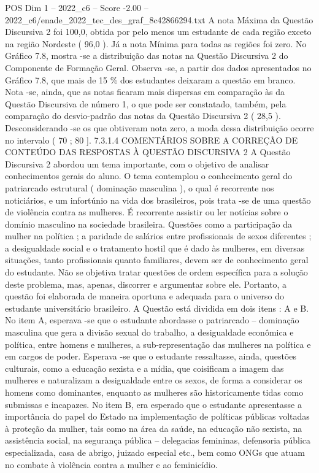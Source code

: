 \begin{textsample}{POS Dim 1 – 2022\_c6 – Score -2.00 – 2022\_c6/enade\_2022\_tec\_des\_graf\_8c42866294.txt}
A nota Máxima da Questão Discursiva 2 foi 100,0, obtida por pelo menos um estudante de cada região exceto na região Nordeste ( 96,0 ).
Já a nota Mínima para todas as regiões foi zero.
No Gráfico 7.8, mostra -se a distribuição das notas na Questão Discursiva 2 do Componente de Formação Geral.
Observa -se, a partir dos dados apresentados no Gráfico 7.8, que mais de 15 \% dos estudantes deixaram a questão em branco.
Nota -se, ainda, que as notas ficaram mais dispersas em comparação às da Questão Discursiva de número 1, o que pode ser constatado, também, pela comparação do desvio-padrão das notas da Questão Discursiva 2 ( 28,5 ).
Desconsiderando -se os que obtiveram nota zero, a moda dessa distribuição ocorre no intervalo ( 70 ; 80 ]. 7.3.1.4 COMENTÁRIOS SOBRE A CORREÇÃO DE CONTEÚDO DAS RESPOSTAS À QUESTÃO DISCURSIVA 2 A Questão Discursiva 2 abordou um tema importante, com o objetivo de analisar conhecimentos gerais do aluno.
O tema contemplou o conhecimento geral do patriarcado estrutural ( dominação masculina ), o qual é recorrente nos noticiários, e um infortúnio na vida dos brasileiros, pois trata -se de uma questão de violência contra as mulheres.
É recorrente assistir ou ler notícias sobre o domínio masculino na sociedade brasileira.
Questões como a participação da mulher na política ; a paridade de salários entre profissionais de sexos diferentes ; a desigualdade social e o tratamento hostil que é dado às mulheres, em diversas situações, tanto profissionais quanto familiares, devem ser de conhecimento geral do estudante.
Não se objetiva tratar questões de ordem específica para a solução deste problema, mas, apenas, discorrer e argumentar sobre ele.
Portanto, a questão foi elaborada de maneira oportuna e adequada para o universo do estudante universitário brasileiro.
A Questão está dividida em dois itens : A e B.
No item A, esperava -se que o estudante abordasse o patriarcado – dominação masculina que gera a divisão sexual do trabalho, a desigualdade econômica e política, entre homens e mulheres, a sub-representação das mulheres na política e em cargos de poder.
Esperava -se que o estudante ressaltasse, ainda, questões culturais, como a educação sexista e a mídia, que coisificam a imagem das mulheres e naturalizam a desigualdade entre os sexos, de forma a considerar os homens como dominantes, enquanto as mulheres são historicamente tidas como submissas e incapazes.
No item B, era esperado que o estudante apresentasse a importância do papel do Estado na implementação de políticas públicas voltadas à proteção da mulher, tais como na área da saúde, na educação não sexista, na assistência social, na segurança pública – delegacias femininas, defensoria pública especializada, casa de abrigo, juizado especial etc., bem como ONGs que atuam no combate à violência contra a mulher e ao feminicídio.

\end{textsample}
